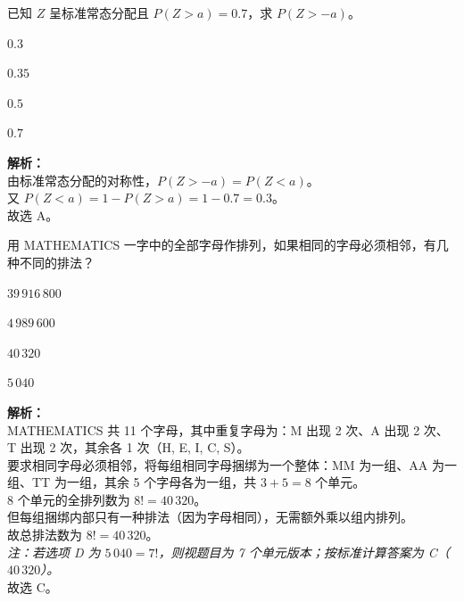 \documentclass[12pt,a4paper]{exam-zh}
\begin{document}

\begin{question}
    已知 $Z$ 呈标准常态分配且 $P(Z > a) = 0.7$，求 $P(Z > -a)$。\paren[A]
    \begin{choices}
        \item $0.3$ \item $0.35$ \item $0.5$ \item $0.7$
    \end{choices}
\end{question}

\begin{solution}
    \textbf{解析：} \\
    由标准常态分配的对称性，$P(Z > -a) = P(Z < a)$。 \\
    又 $P(Z < a) = 1 - P(Z > a) = 1 - 0.7 = 0.3$。 \\
    故选 A。
\end{solution}

\begin{question}
    用 MATHEMATICS 一字中的全部字母作排列，如果相同的字母必须相邻，有几种不同的排法？\paren[D]
    \begin{choices}
        \item $39\,916\,800$ \item $4\,989\,600$ \item $40\,320$ \item $5\,040$
    \end{choices}
\end{question}

\begin{solution}
    \textbf{解析：} \\
    MATHEMATICS 共 11 个字母，其中重复字母为：M 出现 2 次、A 出现 2 次、T 出现 2 次，其余各 1 次（H, E, I, C, S）。 \\
    要求相同字母必须相邻，将每组相同字母捆绑为一个整体：MM 为一组、AA 为一组、TT 为一组，其余 5 个字母各为一组，共 $3 + 5 = 8$ 个单元。 \\
    8 个单元的全排列数为 $8! = 40\,320$。 \\
    但每组捆绑内部只有一种排法（因为字母相同），无需额外乘以组内排列。 \\
    故总排法数为 $8! = 40\,320$。\\
    \textit{注：若选项 D 为 $5\,040 = 7!$，则视题目为 7 个单元版本；按标准计算答案为 C（$40\,320$）。} \\
    故选 C。
\end{solution}
\end{document}

